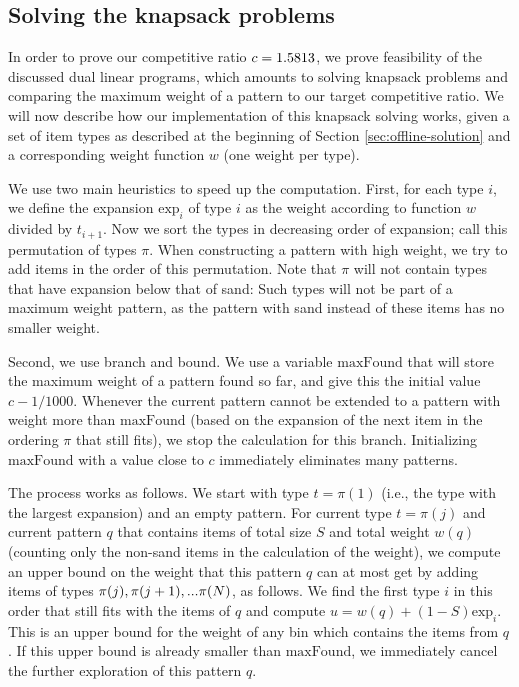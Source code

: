 \subsection{Solving the knapsack problems}\label{sec:implementation-knapsack}

In order to prove our competitive ratio $c=1.5813$, we prove feasibility of the discussed dual linear programs, which amounts to solving knapsack problems and comparing the maximum weight of a pattern to our target competitive ratio. We will now describe how our implementation of this knapsack solving works, given a set of item types as described at the beginning of Section \ref{sec:offline-solution} and a corresponding weight function $w$ (one weight per type).

We use two main heuristics to speed up the computation.
First, for each type $i$, we define the expansion $\text{exp}_i$ of type $i$ as the weight according to function $w$ divided by $t_{i+1}$. Now we sort the types in decreasing order of expansion; call this permutation of types $\pi$.
When constructing a pattern with high weight, we try to add items in the order of this permutation. Note that $\pi$ will not contain types that have expansion below that of sand: Such types will not be part of a maximum weight pattern, as the pattern with sand instead of these items has no smaller weight.

Second, we use branch and bound. We use a variable $\text{maxFound}$ that will store the maximum weight of a pattern found so far,
and give this the initial value $c-1/1000$. Whenever the current pattern cannot be extended to a pattern with weight more than
$\text{maxFound}$ (based on the expansion of the next item in the ordering $\pi$ that still fits), we stop the calculation for
this branch. Initializing $\text{maxFound}$ with a value close to $c$ immediately eliminates many patterns.

The process works as follows.
We start with type $t=\pi(1)$ (i.e., the type with the largest expansion) and an empty pattern.
For current type $t=\pi(j)$ and current pattern $q$ that contains items of total size $S$ and total weight $w(q)$ (counting only the non-sand items in the calculation of the weight), we compute an upper bound on the weight that this pattern $q$ can at most get by adding items of types $\pi(j), \pi(j+1), ... \pi(N)$, as follows. We find the first type $i$ in this order that still fits with the items of $q$ and compute $u = w(q) + (1-S)\text{exp}_i$. This is an upper bound for the weight of any bin which contains the items from $q$. If this upper bound is already smaller than $\text{maxFound}$, we immediately cancel the further exploration of this pattern $q$.

